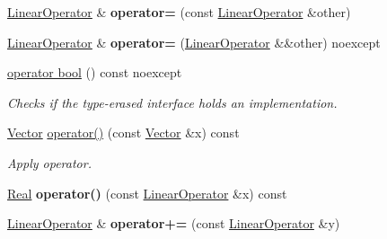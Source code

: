 \begin{DoxyCompactItemize}
\item 
\hypertarget{classSpacy_1_1LinearOperator_a3e1ae48eb708b6130ded1aeccc7711aa}{\hyperlink{classSpacy_1_1LinearOperator}{\-Linear\-Operator} \& {\bfseries operator=} (const \hyperlink{classSpacy_1_1LinearOperator}{\-Linear\-Operator} \&other)}\label{classSpacy_1_1LinearOperator_a3e1ae48eb708b6130ded1aeccc7711aa}

\item 
\hypertarget{classSpacy_1_1LinearOperator_a370ddb98c4e73cab75e648bb02edb97c}{\hyperlink{classSpacy_1_1LinearOperator}{\-Linear\-Operator} \& {\bfseries operator=} (\hyperlink{classSpacy_1_1LinearOperator}{\-Linear\-Operator} \&\&other) noexcept}\label{classSpacy_1_1LinearOperator_a370ddb98c4e73cab75e648bb02edb97c}

\item 
\hyperlink{classSpacy_1_1LinearOperator_a48506fbca4e85aa239f80332cf6c37c1}{operator bool} () const noexcept
\begin{DoxyCompactList}\small\item\em \-Checks if the type-\/erased interface holds an implementation. \end{DoxyCompactList}\item 
\hypertarget{classSpacy_1_1LinearOperator_a54d74eb77e706ee2e087a0363929e946}{\hyperlink{classSpacy_1_1Vector}{\-Vector} \hyperlink{classSpacy_1_1LinearOperator_a54d74eb77e706ee2e087a0363929e946}{operator()} (const \hyperlink{classSpacy_1_1Vector}{\-Vector} \&x) const }\label{classSpacy_1_1LinearOperator_a54d74eb77e706ee2e087a0363929e946}

\begin{DoxyCompactList}\small\item\em \-Apply operator. \end{DoxyCompactList}\item 
\hypertarget{classSpacy_1_1LinearOperator_a75400dbcfa651fed1b37f58a8e722b90}{\hyperlink{classSpacy_1_1Real}{\-Real} {\bfseries operator()} (const \hyperlink{classSpacy_1_1LinearOperator}{\-Linear\-Operator} \&x) const }\label{classSpacy_1_1LinearOperator_a75400dbcfa651fed1b37f58a8e722b90}

\item 
\hypertarget{classSpacy_1_1LinearOperator_a42c28cd0068a08b7547e44aa6ab4a4e7}{\hyperlink{classSpacy_1_1LinearOperator}{\-Linear\-Operator} \& {\bfseries operator+=} (const \hyperlink{classSpacy_1_1LinearOperator}{\-Linear\-Operator} \&y)}\label{classSpacy_1_1LinearOperator_a42c28cd0068a08b7547e44aa6ab4a4e7}


\end{DoxyCompactItemize}
